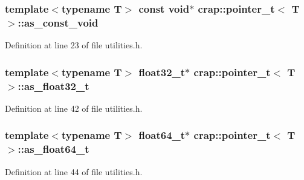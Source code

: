 \hypertarget{structcrap_1_1pointer__t_a76da0338043bbfc7ed947f18ae843d52}{}
\subsubsection[{as\+\_\+const\+\_\+void}]{\setlength{\rightskip}{0pt plus 5cm}template$<$typename T$>$ const void$\ast$ {\bf crap\+::pointer\+\_\+t}$<$ T $>$\+::as\+\_\+const\+\_\+void}\label{structcrap_1_1pointer__t_a76da0338043bbfc7ed947f18ae843d52}


Definition at line 23 of file utilities.\+h.

\hypertarget{structcrap_1_1pointer__t_abf47bccc7d7e58456107e9e32000aa7f}{}
\subsubsection[{as\+\_\+float32\+\_\+t}]{\setlength{\rightskip}{0pt plus 5cm}template$<$typename T$>$ {\bf float32\+\_\+t}$\ast$ {\bf crap\+::pointer\+\_\+t}$<$ T $>$\+::as\+\_\+float32\+\_\+t}\label{structcrap_1_1pointer__t_abf47bccc7d7e58456107e9e32000aa7f}


Definition at line 42 of file utilities.\+h.

\hypertarget{structcrap_1_1pointer__t_ae0aa92260ed533bcb965a1d3cc45349a}{}
\subsubsection[{as\+\_\+float64\+\_\+t}]{\setlength{\rightskip}{0pt plus 5cm}template$<$typename T$>$ {\bf float64\+\_\+t}$\ast$ {\bf crap\+::pointer\+\_\+t}$<$ T $>$\+::as\+\_\+float64\+\_\+t}\label{structcrap_1_1pointer__t_ae0aa92260ed533bcb965a1d3cc45349a}


Definition at line 44 of file utilities.\+h.

\hypertarget{structcrap_1_1pointer__t_af49743e61d30272abb1a93697114aaa9}{}
